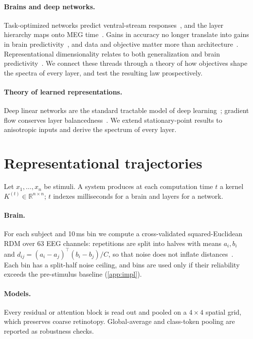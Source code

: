 \documentclass[10pt]{article}
\theoremstyle{plain}
\theoremstyle{definition}
\theoremstyle{remark}
\newcommand{\R}{\mathbb{R}}
\newcommand{\T}{\top}
\begin{document}
\paragraph{Brains and deep networks.} Task-optimized networks predict ventral-stream
responses~\citep{yamins2014performance,schrimpf2018brainscore}, and the layer hierarchy maps onto
MEG time~\citep{cichy2016comparison}. Gains in accuracy no longer translate into gains in brain
predictivity~\citep{linsley2023worse}, and data and objective matter more than
architecture~\citep{conwell2024inductive}. Representational dimensionality relates to both
generalization and brain
predictivity~\citep{stringer2019high,agrawal2022alpha,elmoznino2024high}. We connect these
threads through a theory of how objectives shape the spectra of every layer, and test the
resulting law prospectively.

\paragraph{Theory of learned representations.} Deep linear networks are the standard tractable
model of deep learning~\citep{saxe2014exact,arora2019implicit}; gradient flow conserves layer
balancedness~\citep{du2018balanced}. We extend stationary-point results to anisotropic inputs
and derive the spectrum of every layer.

\section{Representational trajectories}
\label{sec:measure}

Let $x_1,\dots,x_n$ be stimuli. A system produces at each computation time $t$ a kernel
$K^{(t)} \in \R^{n\times n}$; $t$ indexes milliseconds for a brain and layers for a network.

\paragraph{Brain.} For each subject and 10\,ms bin we compute a cross-validated squared-Euclidean
RDM over 63 EEG channels: repetitions are split into halves with means $a_i, b_i$ and
$d_{ij} = (a_i-a_j)^\T(b_i-b_j)/C$, so that noise does not inflate
distances~\citep{walther2016reliability}. Each bin has a split-half noise ceiling, and bins are
used only if their reliability exceeds the pre-stimulus baseline (\cref{app:impl}).

\paragraph{Models.} Every residual or attention block is read out and pooled on a $4\times4$
spatial grid, which preserves coarse retinotopy. Global-average and class-token pooling are
reported as robustness checks.
\end{document}
